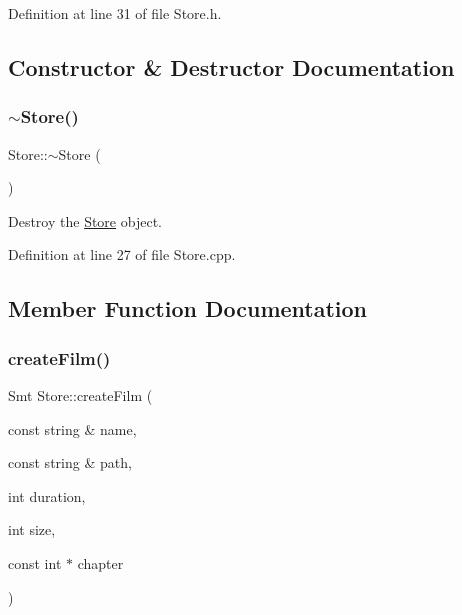 Definition at line 31 of file Store.\+h.



\subsection{Constructor \& Destructor Documentation}
\mbox{\label{class_store_a4fd725fdb2de0632ed98bfbd131c2512}} 
\subsubsection{\texorpdfstring{$\sim$Store()}{~Store()}}
{\footnotesize\ttfamily Store\+::$\sim$\+Store (\begin{DoxyParamCaption}{ }\end{DoxyParamCaption})}



Destroy the \mbox{\hyperlink{class_store}{Store}} object. 



Definition at line 27 of file Store.\+cpp.


\begin{DoxyCode}{0}

\end{DoxyCode}


\subsection{Member Function Documentation}
\mbox{\label{class_store_a34de901d3285715123d39663b2ffd166}} 
\subsubsection{\texorpdfstring{createFilm()}{createFilm()}\hspace{0.1cm}{\footnotesize\ttfamily [1/2]}}
{\footnotesize\ttfamily Smt Store\+::create\+Film (\begin{DoxyParamCaption}\item[{const string \&}]{name,  }\item[{const string \&}]{path,  }\item[{int}]{duration,  }\item[{int}]{size,  }\item[{const int $\ast$}]{chapter }\end{DoxyParamCaption})}



